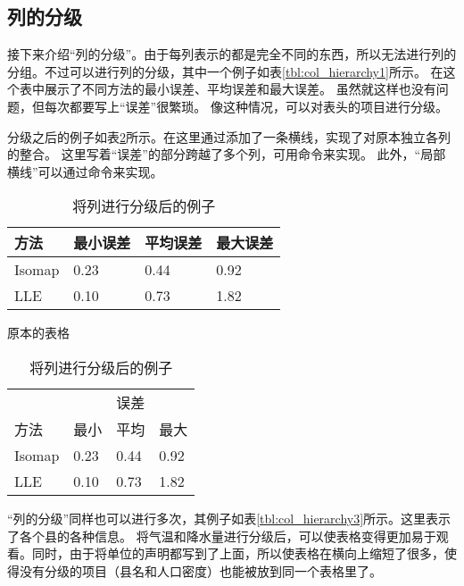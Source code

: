 \documentclass{article}
\newcommand{\Tref}[1]{表\ref{#1}}
\begin{document}
\subsection{列的分级}
接下来介绍“列的分级”。由于每列表示的都是完全不同的东西，所以无法进行列的分组。不过可以进行列的分级，其中一个例子如\Tref{tbl:col_hierarchy1}所示。
在这个表中展示了不同方法的最小误差、平均误差和最大误差。
虽然就这样也没有问题，但每次都要写上“误差”很繁琐。
像这种情况，可以对表头的项目进行分级。

分级之后的例子如\Tref{tbl:col_hierarchy2}所示。在这里通过添加了一条横线，实现了对原本独立各列的整合。
这里写着“误差”的部分跨越了多个列，可用\texttt{\multicolumn}命令来实现。
此外，“局部横线”可以通过\texttt{\cmidrule}命令来实现。


\begin{table}[h]
    \begin{minipage}[t]{0.48\linewidth}
        \centering
        \begin{tabular}{@{}llll@{}} \toprule
            方法 & 最小误差 & 平均误差 & 最大误差 \\ \midrule
            Isomap & 0.23 & 0.44 & 0.92 \\
            LLE    & 0.10 & 0.73 & 1.82 \\ \bottomrule
        \end{tabular}
        \caption{原本的表格}
        \label{tbl:col_hierarchy1}
    \end{minipage}
    \hfill
    \begin{minipage}[t]{0.48\linewidth}
        \centering
        \begin{tabular}{@{}llll@{}} \toprule
            & \multicolumn{3}{c}{误差} \\ \cmidrule(l){2-4}
            方法 & 最小 & 平均 & 最大     \\ \midrule
            Isomap & 0.23 & 0.44 & 0.92 \\
            LLE    & 0.10 & 0.73 & 1.82 \\ \bottomrule
        \end{tabular}
        \caption{将列进行分级后的例子}
        \label{tbl:col_hierarchy2}
    \end{minipage}
\end{table}


“列的分级”同样也可以进行多次，其例子如\Tref{tbl:col_hierarchy3}所示。这里表示了各个县的各种信息。
将气温和降水量进行分级后，可以使表格变得更加易于观看。同时，由于将单位的声明都写到了上面，所以使表格在横向上缩短了很多，使得没有分级的项目（县名和人口密度）也能被放到同一个表格里了。
\end{document}
